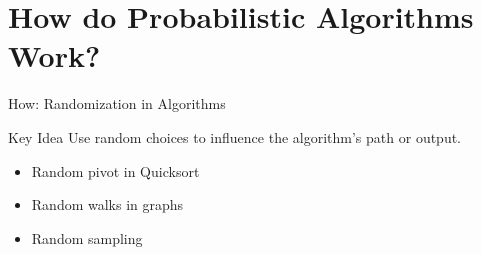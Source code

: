 \documentclass[aspectratio=169]{beamer}
\begin{document}
\section{How do Probabilistic Algorithms Work?}
\begin{frame}{How: Randomization in Algorithms}
  \begin{block}{Key Idea}
    Use random choices to influence the algorithm's path or output.
  \end{block}

  \begin{itemize}
    \item Random pivot in Quicksort

    \item Random walks in graphs

    \item Random sampling
  \end{itemize}
\end{frame}














\begin{frame}[allowframebreaks]
  \printbibliography
\end{frame}
\end{document}

